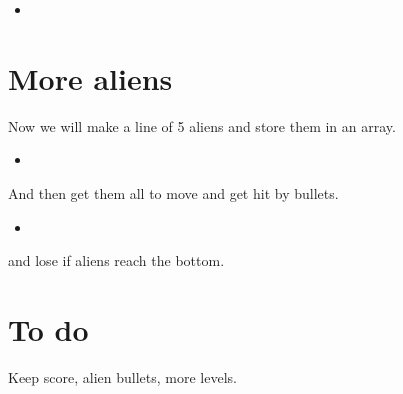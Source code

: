 \documentclass[12pt]{article}
\newcommand{\pythonscript}[2]{
\begin{itemize}
\item[]
\end{itemize}
}
\begin{document}
\pythonscript{hitalien}{Hit the alien}

\section{More aliens}

Now we will make a line of 5 aliens and store them in an array.

\pythonscript{fivealiens}{Line of 5 aliens}

And then get them all to move and get hit by bullets.

\pythonscript{moveallaliens}{Line of 5 aliens}

and lose if aliens reach the bottom.

\section{To do}

Keep score, alien bullets, more levels.
\end{document}
